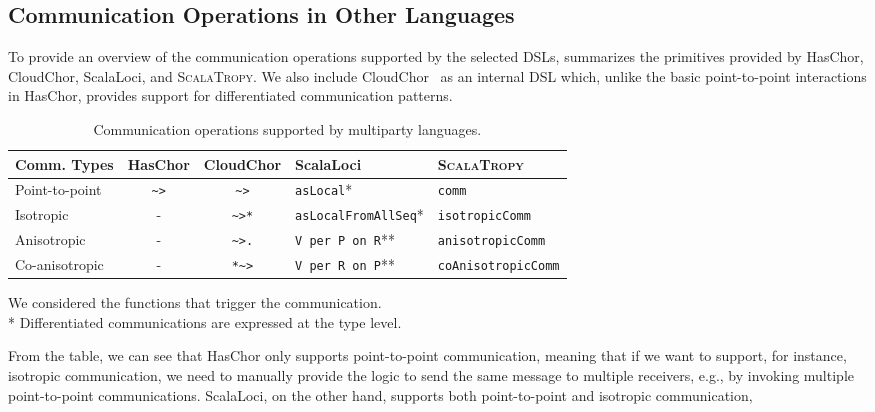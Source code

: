 \documentclass[runningheads]{llncs}
\newcommand{\ourLang}{\textsc{ScalaTropy}}
\newcommand{\code}[1]{\lstinline[style=scala3,basicstyle=\ttfamily\small\color{vscLightText}]{#1}}
\newcommand{\diff}[1]{{#1}}
\begin{document}
\subsection{Communication Operations in Other Languages}
To provide an overview of the communication operations supported by the selected DSLs,
 summarizes the primitives provided by HasChor, CloudChor, ScalaLoci, and \ourLang{}.
%
\diff{We also include CloudChor~\cite{DBLP:conf/pepm/IonescuR26} as an internal DSL which, 
unlike the basic point-to-point interactions in HasChor, 
provides support for differentiated communication patterns.}
\begin{table}
    \centering
    \caption{Communication operations supported by multiparty languages.}
    \label{tab:comm-operations}
    \setlength{\extrarowheight}{2pt}
    \setlength{\tabcolsep}{3pt}
    \begin{tabularx}{\textwidth}{X c c l l}
        \hline
        \textbf{Comm. Types} & \textbf{HasChor} & \textbf{CloudChor} & \textbf{ScalaLoci} & \textbf{\ourLang{}} \\ \hline\hline
        Point-to-point       & \texttt{\textasciitilde>}        & \texttt{\textasciitilde>}   & \texttt{asLocal}*      & \code{comm}       \\ \hline
        Isotropic            & -  & \texttt{\textasciitilde>*}  & \texttt{asLocalFromAllSeq}*      & \code{isotropicComm}       \\ \hline
        Anisotropic          & -  & \texttt{\textasciitilde>.}  & \code{V per P on R}**      & \code{anisotropicComm}       \\ \hline
        Co-anisotropic       & -  & \texttt{*\textasciitilde>}  & \code{V per R on P}**      & \code{coAnisotropicComm}       \\ \hline
    \end{tabularx}
    \vspace{2pt}

    {\small * We considered the functions that trigger the communication.}\\
    {\small ** Differentiated communications are expressed at the type level.}
\end{table}
From the table,
we can see that HasChor only supports point-to-point communication,
meaning that if we want to support, for instance,
isotropic communication,
we need to manually provide the logic to send the same message to multiple receivers,
e.g., by invoking multiple point-to-point communications.
%
ScalaLoci,
on the other hand,
supports both point-to-point and isotropic communication,
\end{document}
